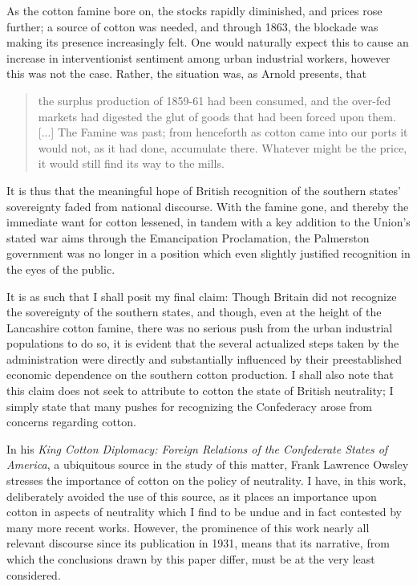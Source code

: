 As the cotton famine bore on, the stocks rapidly diminished, and prices rose further; a source of cotton was needed, and through 1863, the blockade was making its presence increasingly felt. One would naturally expect this to cause  an increase in interventionist sentiment among urban industrial workers, however this was not the case\autocite{steeleOntologicalSecurity2005}. Rather, the situation was, as Arnold presents, that
\begin{quote}
    the surplus production of 1859-61 had been consumed, and the over-fed markets had digested the glut of goods that had been forced upon them. [...]
    The Famine was past; from henceforth as cotton came into our ports it would not, as it had done, accumulate there. Whatever might be the
    price, it would still find its way to the mills. \Autocite[331]{arnoldHistoryCotton1864}
\end{quote}
It is thus that the meaningful hope of British recognition of the southern states' sovereignty faded from national discourse. With the famine gone, and thereby the immediate want for cotton lessened, in tandem with a key addition to the Union's stated war aims through the Emancipation Proclamation, the Palmerston government was no longer in a position which even slightly justified recognition in the eyes of the public\Autocites{ewanEmancipationProclamation2005}{steeleOntologicalSecurity2005}.

It is as such that I shall posit my final claim: Though Britain did not recognize the sovereignty of the southern states, and though, 
even at the height of the Lancashire cotton famine, there was no serious push from the urban industrial populations to do so, it is evident that the several actualized
steps taken by the administration were directly and substantially influenced by their preestablished economic dependence on the southern cotton production. I shall
also note that this claim does not seek to attribute to cotton the state of British neutrality; I simply state that many pushes for
recognizing the Confederacy arose from concerns regarding cotton.

\hfill

In his \textit{King Cotton Diplomacy: Foreign Relations of the Confederate States of America}, a ubiquitous source in the study of this matter,
Frank Lawrence Owsley stresses the importance of cotton on the policy of neutrality. I have, in this work,
deliberately avoided the use of this source, as it places an importance upon cotton in aspects of neutrality which I find to be undue and in fact contested by
many more recent works. However, the prominence of this work nearly all relevant discourse since its publication in 1931, means that
its narrative, from which the conclusions drawn by this paper differ, must be at the very least considered.

